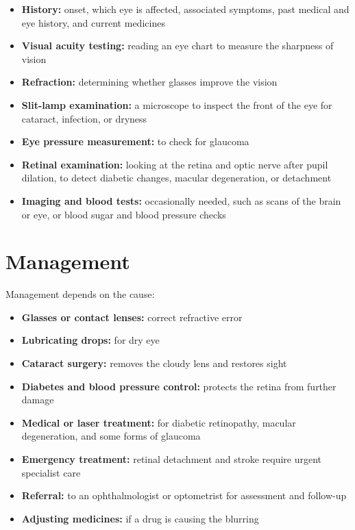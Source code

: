 \begin{itemize}
    \item \textbf{History:} onset, which eye is affected, associated symptoms, past medical and eye history, and current medicines
    \item \textbf{Visual acuity testing:} reading an eye chart to measure the sharpness of vision
    \item \textbf{Refraction:} determining whether glasses improve the vision
    \item \textbf{Slit-lamp examination:} a microscope to inspect the front of the eye for cataract, infection, or dryness
    \item \textbf{Eye pressure measurement:} to check for glaucoma
    \item \textbf{Retinal examination:} looking at the retina and optic nerve after pupil dilation, to detect diabetic changes, macular degeneration, or detachment
    \item \textbf{Imaging and blood tests:} occasionally needed, such as scans of the brain or eye, or blood sugar and blood pressure checks
\end{itemize}

\section*{Management}
Management depends on the cause:

\begin{itemize}
    \item \textbf{Glasses or contact lenses:} correct refractive error
    \item \textbf{Lubricating drops:} for dry eye
    \item \textbf{Cataract surgery:} removes the cloudy lens and restores sight
    \item \textbf{Diabetes and blood pressure control:} protects the retina from further damage
    \item \textbf{Medical or laser treatment:} for diabetic retinopathy, macular degeneration, and some forms of glaucoma
    \item \textbf{Emergency treatment:} retinal detachment and stroke require urgent specialist care
    \item \textbf{Referral:} to an ophthalmologist or optometrist for assessment and follow-up
    \item \textbf{Adjusting medicines:} if a drug is causing the blurring
\end{itemize}

